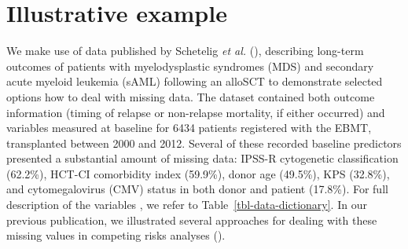 \documentclass[
  letterpaper,
  paper=240mm:170mm,
  twoside=true,
  open=right,
  fontsize=10pt,
  pagesize=false,
  BCOR=15mm,
  DIV=14,
  headinclude=true,
  footinclude=false,
  headsepline=on]{scrbook}
\begin{document}
\section{Illustrative example}\label{illustrative-example}

We make use of data published by Schetelig \emph{et al.}
(),
describing long-term outcomes of patients with myelodysplastic syndromes
(MDS) and secondary acute myeloid leukemia (sAML) following an alloSCT
to demonstrate selected options how to deal with missing data. The
dataset contained both outcome information (timing of relapse or
non-relapse mortality, if either occurred) and variables measured at
baseline for 6434 patients registered with the EBMT, transplanted
between 2000 and 2012. Several of these recorded baseline predictors
presented a substantial amount of missing data: IPSS-R cytogenetic
classification (62.2\%), HCT-CI comorbidity index (59.9\%), donor age
(49.5\%), KPS (32.8\%), and cytomegalovirus (CMV) status in both donor
and patient (17.8\%). For full description of the variables , we refer
to Table~\ref{tbl-data-dictionary}. In our previous publication, we
illustrated several approaches for dealing with these missing values in
competing risks analyses
().

\begingroup\fontsize{7}{9}\selectfont
\end{document}
